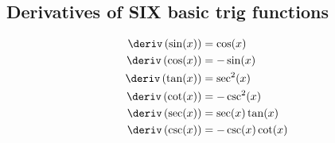 \subsection{Derivatives of SIX basic trig functions}
\begin{align}
    \deriv \left(\sin(x)\right) &= \cos(x) \\
    \deriv \left(\cos(x)\right) &= -\sin(x) \\
    \deriv \left(\tan(x)\right) &= \sec^2(x) \\
    \deriv \left(\cot(x)\right) &= -\csc^2(x) \\
    \deriv \left(\sec(x)\right) &= \sec(x)\tan(x) \\
    \deriv \left(\csc(x)\right) &= -\csc(x)\cot(x)
\end{align}
